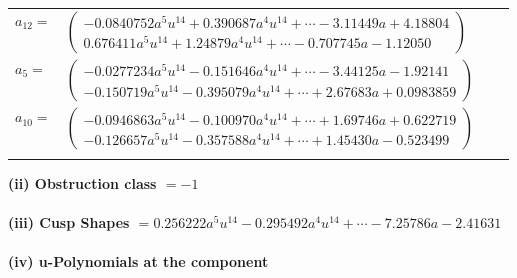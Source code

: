 \documentclass[1p]{elsarticle_modified}
\theoremstyle{definition}
\begin{document}
\begin{tabular}{m{7pt} m{180pt} m{7pt} m{180pt} }
\flushright $a_{12}=$&$\begin{pmatrix}-0.0840752 a^{5} u^{14}+0.390687 a^{4} u^{14}+\cdots-3.11449 a+4.18804\\0.676411 a^{5} u^{14}+1.24879 a^{4} u^{14}+\cdots-0.707745 a-1.12050\end{pmatrix}$ \\
\flushright $a_{5}=$&$\begin{pmatrix}-0.0277234 a^{5} u^{14}-0.151646 a^{4} u^{14}+\cdots-3.44125 a-1.92141\\-0.150719 a^{5} u^{14}-0.395079 a^{4} u^{14}+\cdots+2.67683 a+0.0983859\end{pmatrix}$ \\
\flushright $a_{10}=$&$\begin{pmatrix}-0.0946863 a^{5} u^{14}-0.100970 a^{4} u^{14}+\cdots+1.69746 a+0.622719\\-0.126657 a^{5} u^{14}-0.357588 a^{4} u^{14}+\cdots+1.45430 a-0.523499\end{pmatrix}$\\&\end{tabular}
\flushleft \textbf{(ii) Obstruction class $= -1$}\\~\\
\flushleft \textbf{(iii) Cusp Shapes $= 0.256222 a^{5} u^{14}-0.295492 a^{4} u^{14}+\cdots-7.25786 a-2.41631$}\\~\\
\newpage\renewcommand{\arraystretch}{1}
\flushleft \textbf{(iv) u-Polynomials at the component}\newline \\
\end{document}
